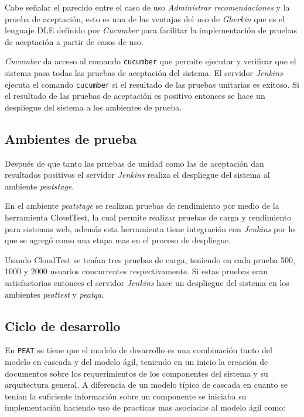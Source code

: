 Cabe señalar el parecido entre el caso de uso \textit{Administrar recomendaciones}
y la prueba de aceptación, esto es una de las ventajas del uso de \textit{Gherkin}
que es el lenguaje DLE definido por \textit{Cucumber} para facilitar la
implementación de pruebas de aceptación a partir de casos de uso.

\textit{Cucumber} da acceso al comando \texttt{cucumber} que permite ejecutar y
verificar que el sistema pasa todas las pruebas de aceptación del sistema.
El servidor \textit{Jenkins} ejecuta el comando \texttt{cucumber} si el resultado
de las pruebas unitarias es exitoso. Si el resultado de las pruebas de aceptación es
positivo entonces se hace un despliegue del sistema a los ambientes de prueba.

\subsection{Ambientes de prueba}

Después de que tanto las pruebas de unidad como las de aceptación dan resultados
positivos el servidor \textit{Jenkins} realiza el despliegue del sistema al ambiente
\textit{peatstage}.

En el ambiente \textit{peatstage} se realizan pruebas de rendimiento por medio
de la herramienta CloudTest, la cual permite realizar pruebas de carga y
rendimiento para sistemas web, además esta herramienta tiene integración con
\textit{Jenkins} por lo que se agregó como una etapa mas en el proceso de despliegue.

Usando CloudTest se tenían tres pruebas de carga, teniendo en cada prueba 500, 1000
y 2000 usuarios concurrentes respectivamente. Si estas pruebas eran satisfactorias
entonces el servidor \textit{Jenkins} hace un despliegue del sistema en los
ambientes \textit{peattest} y \textit{peatqa}.

\subsection{Ciclo de desarrollo}

En \texttt{PEAT} se tiene que el modelo de desarrollo es una combinación tanto del
modelo en cascada y del modelo ágil, teniendo en un inicio la creación de documentos
sobre los requerimientos de los componentes del sistema y su arquitectura general.
A diferencia de un modelo típico de cascada en cuanto se tenían la suficiente
información sobre un componente se iniciaba su implementación haciendo uso de
practicas mas asociadas al modelo ágil como:

